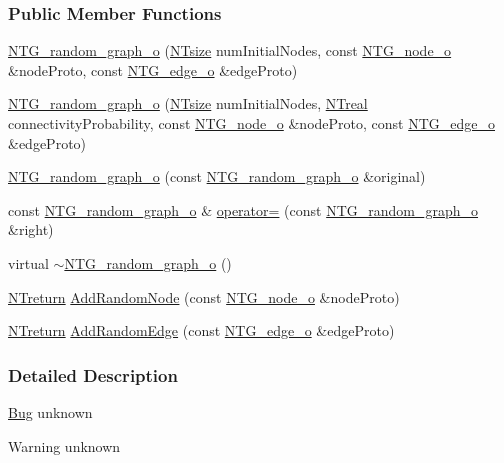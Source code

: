 \subsubsection*{Public Member Functions}
\begin{DoxyCompactItemize}
\item 
\hyperlink{class_n_t_g__random__graph__o_a3f197a45ebfac65185b10461c3afc068}{NTG\_\-random\_\-graph\_\-o} (\hyperlink{nt__types_8h_a06c124f2e4469769b58230253ce0560b}{NTsize} numInitialNodes, const \hyperlink{class_n_t_g__node__o}{NTG\_\-node\_\-o} \&nodeProto, const \hyperlink{class_n_t_g__edge__o}{NTG\_\-edge\_\-o} \&edgeProto)
\item 
\hyperlink{class_n_t_g__random__graph__o_a80e1dbe0da78d0f92241846c5b781fc0}{NTG\_\-random\_\-graph\_\-o} (\hyperlink{nt__types_8h_a06c124f2e4469769b58230253ce0560b}{NTsize} numInitialNodes, \hyperlink{nt__types_8h_a814a97893e9deb1eedcc7604529ba80d}{NTreal} connectivityProbability, const \hyperlink{class_n_t_g__node__o}{NTG\_\-node\_\-o} \&nodeProto, const \hyperlink{class_n_t_g__edge__o}{NTG\_\-edge\_\-o} \&edgeProto)
\item 
\hyperlink{class_n_t_g__random__graph__o_a74b9e44634cb26e2d88ec81927c94c60}{NTG\_\-random\_\-graph\_\-o} (const \hyperlink{class_n_t_g__random__graph__o}{NTG\_\-random\_\-graph\_\-o} \&original)
\item 
const \hyperlink{class_n_t_g__random__graph__o}{NTG\_\-random\_\-graph\_\-o} \& \hyperlink{class_n_t_g__random__graph__o_a03c5e6e2899c4d01064e11ea19de31e0}{operator=} (const \hyperlink{class_n_t_g__random__graph__o}{NTG\_\-random\_\-graph\_\-o} \&right)
\item 
virtual \hyperlink{class_n_t_g__random__graph__o_a65c1012af6f5437dd4bfebb2615ca4f0}{$\sim$NTG\_\-random\_\-graph\_\-o} ()
\item 
\hyperlink{nt__types_8h_ab9564ee8f091e809d21b8451c6683c53}{NTreturn} \hyperlink{class_n_t_g__random__graph__o_ac8c33b43db6bfca77b22abcfae370dd1}{AddRandomNode} (const \hyperlink{class_n_t_g__node__o}{NTG\_\-node\_\-o} \&nodeProto)
\item 
\hyperlink{nt__types_8h_ab9564ee8f091e809d21b8451c6683c53}{NTreturn} \hyperlink{class_n_t_g__random__graph__o_a7185b51b6716b770a29f9f1da4761faf}{AddRandomEdge} (const \hyperlink{class_n_t_g__edge__o}{NTG\_\-edge\_\-o} \&edgeProto)
\end{DoxyCompactItemize}


\subsubsection{Detailed Description}
\begin{Desc}
\item[\hyperlink{bug__bug000089}{Bug}]unknown \end{Desc}
\begin{DoxyWarning}{Warning}
unknown 
\end{DoxyWarning}


